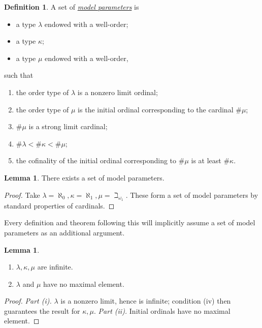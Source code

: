 \documentclass{article}
\newcommand{\cdef}[3]{\href{https://leanprover-community.github.io/con-nf/doc/ConNF/#1.html\#ConNF.#2}{\emph{#3}}}
\theoremstyle{definition}
\newtheorem{definition}{Definition}[section]
\newtheorem{lemma}[theorem]{Lemma}
\theoremstyle{remark}
\begin{document}
\begin{definition}
    \label{def:params}
    A set of \cdef{Atom/Params}{Params}{model parameters} is
    \begin{itemize}
        \item a type \( \lambda \) endowed with a well-order;
        \item a type \( \kappa \);
        \item a type \( \mu \) endowed with a well-order,
    \end{itemize}
    such that
    \begin{enumerate}
        \item the order type of \( \lambda \) is a nonzero limit ordinal;
        \item the order type of \( \mu \) is the initial ordinal corresponding to the cardinal \( \#\mu \);
        \item \( \#\mu \) is a strong limit cardinal;
        \item \( \#\lambda < \#\kappa < \#\mu \);
        \item the cofinality of the initial ordinal corresponding to \( \#\mu \) is at least \( \#\kappa \).
    \end{enumerate}
\end{definition}
\begin{lemma}
    There exists a set of model parameters.
\end{lemma}
\begin{proof}
    Take \( \lambda = \aleph_0, \kappa = \aleph_1, \mu = \beth_{\omega_1} \).
    These form a set of model parameters by standard properties of cardinals.
\end{proof}
Every definition and theorem following this will implicitly assume a set of model parameters as an additional argument.
\begin{lemma}
    \label{lem:infinite_no_max_model_params}
    \begin{enumerate}
        \item \( \lambda, \kappa, \mu \) are infinite.
        \item \( \lambda \) and \( \mu \) have no maximal element.
    \end{enumerate}
\end{lemma}
\begin{proof}
    \emph{Part (i).}
    \( \lambda \) is a nonzero limit, hence is infinite; condition (iv) then guarantees the result for \( \kappa, \mu \).
    \emph{Part (ii).}
    Initial ordinals have no maximal element.
\end{proof}
\end{document}
